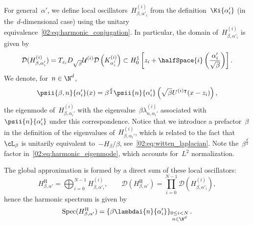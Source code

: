     For general~$\alpha'$, we define local oscillators~$H^{(i)}_{\beta,\alpha'_i}$ from the definition~$\Ki{\alpha'_i}$ (in the~$d$-dimensional case) using the unitary equivalence~\eqref{02:eq:harmonic_conjugation}.
    In particular, the domain of~$H_{\beta,\alpha'_i}^{(i)}$ is given by
    \begin{equation}
        \label{02:eq:local_harm_domain}
        \mathcal D(H^{(i)}_{\beta,\alpha'_i}) = T_{z_i}D_{\sqrt\beta}\mathcal U^{(i)}\mathcal D\left(K_{\alpha'_i}^{(i)}\right)\subset H_0^1\left[z_i + \halfSpace{i}\left(\frac{\alpha'_i}{\sqrt\beta}\right)\right].
    \end{equation}
    We denote, for~$n\in\N^d$,
    \begin{equation}
        \label{02:eq:harmonic_eigenmode}
        \psii{\beta,n}{\alpha_i'}(x) = \beta^{\frac d4}\psii{n}{\alpha_i'}\left(\sqrt\beta U^{(i)\intercal}(x-z_i)\right),
    \end{equation}
    the eigenmode of~$H^{(i)}_{\beta,\alpha_i'}$ with the eigenvalue~$\beta\lambda^{(i)}_{n,\alpha_i'}$ associated with~$\psii{n}{\alpha_i'}$ under this correspondence. 
    Notice that we introduce a prefactor~$\beta$ in the definition of the eigenvalues of~$H_{\beta,\alpha_i'}^{(i)}$, which is related to the fact that~$\cL_\beta$ is unitarily equivalent to~$-H_\beta/\beta$, see~\eqref{02:eq:witten_laplacian}.
    Note the~$\beta^{\frac d4}$ factor in~\eqref{02:eq:harmonic_eigenmode}, which accounts for~$L^2$ normalization.

    The global approximation is formed by a direct sum of these local oscillators:
    \begin{equation}
        \label{02:eq:global_harmonic_approximation_conj}
        H_{\beta,\alpha'}^{\mathrm H} = \bigoplus_{i=0}^{N-1} H^{(i)}_{\beta,\alpha'_i},\qquad \mathcal D(H_{\beta,\alpha'}^{\mathrm H}) = \prod_{i=0}^{N-1} \mathcal D(H^{(i)}_{\beta,\alpha'_i}),
    \end{equation}
    hence the harmonic spectrum is given by
    \begin{equation}
        \label{02:eq:full_harmonic_approximation_spectrum}
        \mathrm{Spec}(H_{\beta,\alpha'}^{\mathrm H}) = \left\{\beta\lambdai{n}{\alpha'_i}\right\}_{\substack{0\leq i<N\\n\in\N^d}}.
    \end{equation}
    
